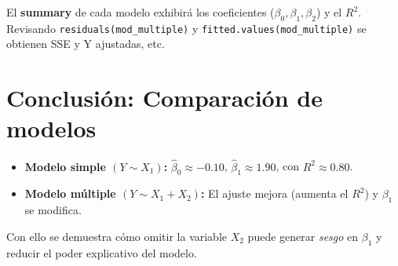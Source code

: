 \documentclass[10pt,a4paper]{article}
\begin{document}
El \textbf{summary} de cada modelo exhibirá los coeficientes (\(\beta_0,\beta_1,\beta_2\)) y el \(R^2\). Revisando \texttt{residuals(mod_multiple)} y \texttt{fitted.values(mod_multiple)} se obtienen SSE y Y ajustadas, etc.

\section*{Conclusi\'on: Comparaci\'on de modelos}

\begin{itemize}
 \item \textbf{Modelo simple $(Y \sim X_1)$:}  $\hat{\beta}_0\approx -0.10$, $\hat{\beta}_1\approx 1.90$, con 
   $R^2\approx 0.80$.
 \item \textbf{Modelo m\'ultiple $(Y \sim X_1+X_2)$:} El ajuste mejora (aumenta el $R^2$) y $\beta_1$ se modifica. 
\end{itemize}

Con ello se demuestra c\'omo omitir la variable $X_2$ puede generar \emph{sesgo} en $\beta_1$ y reducir el poder explicativo del modelo.
\end{document}
